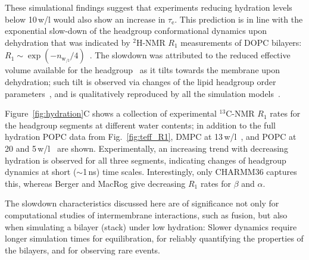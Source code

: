 \documentclass[journal=jcisd8,manuscript=article,layout=twocolumn]{achemso}
\begin{document}
These simulational findings suggest that
experiments reducing hydration levels below 10\,w/l would also show an increase in $\tau_\mathrm e$.
This prediction is in line with the
exponential slow-down
of the headgroup conformational dynamics
upon dehydration that was indicated by $^2$H-NMR $R_{1}$ measurements
of DOPC bilayers:
$R_1\sim\exp(-n_{{\mathrm w\!}_{\!/\mathrm l}}/4)$~\cite{ulrich94}.
%
The slowdown was attributed to the reduced effective volume available for the headgroup~\cite{ulrich94}
as it tilts towards the membrane upon dehydration;
such tilt is observed via changes of the lipid headgroup order parameters~\cite{bechinger91},
and is qualitatively reproduced by all the simulation models~\cite{botan15}.



Figure~\ref{fig:hydration}C shows
a collection of experimental $^{13}$C-NMR $R_1$ rates
for the headgroup segments at different water contents;
in addition to the full hydration POPC data from Fig.~\ref{fig:teff_R1},
DMPC at 13\,w/l~\cite{pham15}, %
and POPC at 20 and 5\,w/l~\cite{Volke:1995a} %
are shown.
%
Experimentally, an increasing trend with decreasing hydration is observed for all three segments,
indicating changes of headgroup dynamics at short ($\sim$1\,ns) time scales.
Interestingly, only CHARMM36 captures this,
whereas Berger and MacRog give decreasing $R_1$ rates for $\beta$ and $\alpha$.
%

The slowdown characteristics discussed here are of significance
not only for computational studies of inter\-membrane interactions, such as fusion,  but also when simulating a bilayer (stack) under low hydration: Slower dynamics require longer simulation times for equilibration, for reliably quantifying the properties of the bilayers, and for observing rare events. %
\end{document}
